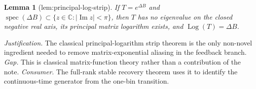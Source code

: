 \documentclass{article}
\newtheorem{lemma}{Lemma}
\begin{document}
\begin{lemma}[lem:principal-log-strip]\label{lem:principal-log-strip}
If \(T=e^{\Delta B}\) and \(\operatorname{spec}(\Delta B)\subset\{z\in\mathbb C:|\operatorname{Im}z|<\pi\}\), then \(T\) has no eigenvalue on the closed negative real axis, its principal matrix logarithm exists, and \(\operatorname{Log}(T)=\Delta B\).
\end{lemma}
\par\smallskip\noindent \textit{Justification.} The classical principal-logarithm strip theorem is the only non-novel ingredient needed to remove matrix-exponential aliasing in the feedback branch. \textit{Gap.} This is classical matrix-function theory rather than a contribution of the note. \textit{Consumer.} The full-rank stable recovery theorem uses it to identify the continuous-time generator from the one-bin transition.
\end{document}
